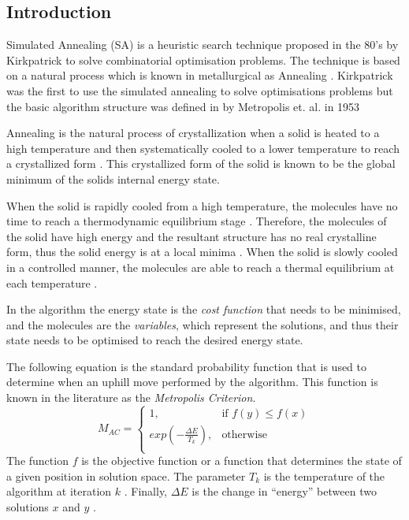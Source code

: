 \subsection{Introduction}
\label{sec:SAIntroduction}
Simulated Annealing (SA) is a heuristic search technique proposed in the 80's by Kirkpatrick to solve combinatorial optimisation problems. The technique is based on a natural process which is known in metallurgical as Annealing \cite{CurveFittingSA,SASingleMultiObj,TempCyclingSA,ChaosSA}. Kirkpatrick was the first to use the simulated annealing to solve optimisations problems but the basic algorithm structure was defined in by Metropolis et. al. in 1953 \cite{CurveFittingSA,VeryFastSAImageEnchancement}

Annealing is the natural process of crystallization when a solid is heated to a high temperature and then systematically cooled to a lower temperature to reach a crystallized form \cite{CurveFittingSA,NewSAs,MobileRobotSA,ConstantTempSA}. This crystallized form of the solid is known to be the global minimum of the solids internal energy state. 

When the solid is rapidly cooled from a high temperature, the molecules have no time to reach a thermodynamic equilibrium stage \cite{CurveFittingSA,NewSAs,MobileRobotSA,ConstantTempSA}. Therefore, the molecules of the solid have high energy and the resultant structure has no real crystalline form, thus the solid energy is at a local minima \cite{CurveFittingSA,NewSAs,MobileRobotSA}. When the solid is slowly cooled in a controlled manner, the molecules are able to reach a thermal equilibrium at each temperature \cite{ChaosSA,CurveFittingSA,NewSAs,MobileRobotSA,ConstantTempSA}.

In the algorithm the energy state is the \emph{cost function} that needs to be minimised, and the molecules are the \emph{variables}, which represent the solutions, and thus their state needs to be optimised to reach the desired energy state.

The following equation is the standard probability function that is used to determine when an uphill move performed by the algorithm. This function is known in the literature as the \emph{Metropolis Criterion}. 
\begin{equation}
\label{eq:saprobability}
	M_{AC} =
	\begin{cases}
	1, &\text{if $f(y) \leq f(x)$}\\
	exp(-\frac{\Delta E}{T_k}), &\text{otherwise}\\
	\end{cases}
\end{equation}
The function $f$ is the objective function or a function that determines the state of a given position in solution space\cite{EcoEquilSA}. The parameter $T_k$ is the temperature of the algorithm at iteration $k$ \cite{EcoEquilSA}. Finally, $\Delta E$ is the change in ``energy'' between two solutions $x$ and $y$ \cite{EcoEquilSA}.

